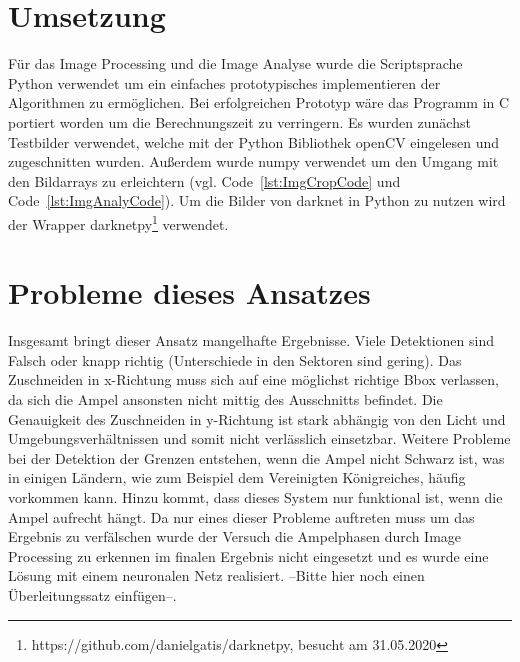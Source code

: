\documentclass[a4paper,oneside,12pt]{report}
\begin{document}
\begin{onehalfspace}
		\section{Umsetzung}
		Für das Image Processing und die Image Analyse wurde die Scriptsprache Python verwendet um ein einfaches prototypisches implementieren der Algorithmen zu ermöglichen. Bei erfolgreichen Prototyp wäre das Programm in C portiert worden um die Berechnungszeit zu verringern. Es wurden zunächst Testbilder verwendet, welche mit der Python Bibliothek openCV eingelesen und zugeschnitten wurden. Außerdem wurde numpy verwendet um den Umgang mit den Bildarrays zu erleichtern (vgl. Code~\ref{lst:ImgCropCode} und Code~\ref{lst:ImgAnalyCode}). Um die Bilder von darknet in Python zu nutzen wird der Wrapper darknetpy\footnote{https://github.com/danielgatis/darknetpy, besucht am 31.05.2020} verwendet.
		
		
		\section{Probleme dieses Ansatzes}
		Insgesamt bringt dieser Ansatz mangelhafte Ergebnisse. Viele Detektionen sind Falsch oder knapp richtig (Unterschiede in den Sektoren sind gering). Das Zuschneiden in x-Richtung muss sich auf eine möglichst richtige Bbox verlassen, da sich die Ampel ansonsten nicht mittig des Ausschnitts befindet. Die Genauigkeit des Zuschneiden in y-Richtung ist stark abhängig von den Licht und Umgebungsverhältnissen und somit nicht verlässlich einsetzbar. Weitere Probleme bei der Detektion der Grenzen entstehen, wenn die Ampel nicht Schwarz ist, was in einigen Ländern, wie zum Beispiel dem Vereinigten Königreiches, häufig vorkommen kann. Hinzu kommt, dass dieses System nur funktional ist, wenn die Ampel aufrecht hängt. Da nur eines dieser Probleme auftreten muss um das Ergebnis zu verfälschen wurde der Versuch die Ampelphasen durch Image Processing zu erkennen im finalen Ergebnis nicht eingesetzt und es wurde eine Lösung mit einem neuronalen Netz realisiert.
		--Bitte hier noch einen Überleitungssatz einfügen--.
		
		
	\end{onehalfspace}
\end{document}
